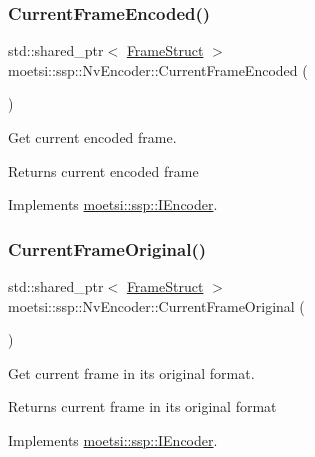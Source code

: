 \subsubsection{\texorpdfstring{Current\+Frame\+Encoded()}{CurrentFrameEncoded()}}
{\footnotesize\ttfamily std\+::shared\+\_\+ptr$<$ \hyperlink{structmoetsi_1_1ssp_1_1FrameStruct}{Frame\+Struct} $>$ moetsi\+::ssp\+::\+Nv\+Encoder\+::\+Current\+Frame\+Encoded (\begin{DoxyParamCaption}{ }\end{DoxyParamCaption})\hspace{0.3cm}{\ttfamily [virtual]}}



Get current encoded frame. 

\begin{DoxyReturn}{Returns}
current encoded frame 
\end{DoxyReturn}


Implements \hyperlink{classmoetsi_1_1ssp_1_1IEncoder_a178d117518e7c7007414ea9c82bd3ed6}{moetsi\+::ssp\+::\+I\+Encoder}.

\mbox{\label{classmoetsi_1_1ssp_1_1NvEncoder_a56baf331eae448da89ee54b69fec170c}} 
\subsubsection{\texorpdfstring{Current\+Frame\+Original()}{CurrentFrameOriginal()}}
{\footnotesize\ttfamily std\+::shared\+\_\+ptr$<$ \hyperlink{structmoetsi_1_1ssp_1_1FrameStruct}{Frame\+Struct} $>$ moetsi\+::ssp\+::\+Nv\+Encoder\+::\+Current\+Frame\+Original (\begin{DoxyParamCaption}{ }\end{DoxyParamCaption})\hspace{0.3cm}{\ttfamily [virtual]}}



Get current frame in its original format. 

\begin{DoxyReturn}{Returns}
current frame in its original format 
\end{DoxyReturn}


Implements \hyperlink{classmoetsi_1_1ssp_1_1IEncoder_ab60bdaae0a85289dfa31a12bab533dc0}{moetsi\+::ssp\+::\+I\+Encoder}.

